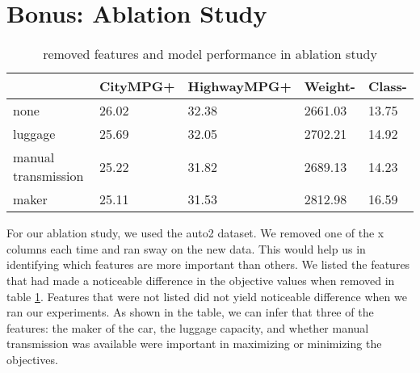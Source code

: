 \section{Bonus: Ablation Study}
\label{sec:bonus_ablation}


\begin{table}[]
  \begin{tabular}{lllll}
                      & CityMPG+ & HighwayMPG+ & Weight- & Class- \\
                      \hline
  none                & 26.02    & 32.38       & 2661.03 & 13.75  \\
  luggage             & 25.69    & 32.05       & 2702.21 & 14.92  \\
  manual transmission & 25.22    & 31.82       & 2689.13 & 14.23  \\
  maker               & 25.11    & 31.53       & 2812.98 & 16.59 
  \end{tabular}
  \caption{removed features and model performance in ablation study}
  \label{tab:ablation}
  \end{table}


  For our ablation study, we used the auto2 dataset. We removed one of
  the x columns each time and ran sway on the new data. This would help
  us in identifying which features are more important than others. We
  listed the features that had made a noticeable difference in the
  objective values when removed in table \ref{tab:ablation}. Features
  that were not listed did not yield noticeable difference when we ran
  our experiments. As shown in the table, we can infer that three of the
  features: the maker of the car, the luggage capacity, and whether
  manual transmission was available were important in maximizing or
  minimizing the objectives.